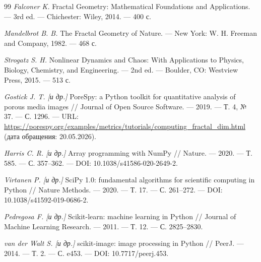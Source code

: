 \begin{thebibliography}{99}
\emph{Falconer K.} Fractal Geometry: Mathematical Foundations and
Applications. --- 3rd ed. --- Chichester: Wiley, 2014. --- 400 с.

\emph{Mandelbrot B. B.} The Fractal Geometry of Nature. --- New York:
W. H. Freeman and Company, 1982. --- 468 с.

\emph{Strogatz S. H.} Nonlinear Dynamics and Chaos: With Applications to
Physics, Biology, Chemistry, and Engineering. --- 2nd ed. --- Boulder, CO:
Westview Press, 2015. --- 513 с.

\emph{Gostick J. T. [и др.]} PoreSpy: a Python toolkit for quantitative
analysis of porous media images // Journal of Open Source Software. ---
2019. --- Т. 4, № 37. --- С. 1296. --- URL:
\url{https://porespy.org/examples/metrics/tutorials/computing_fractal_dim.html}
(дата обращения: 20.05.2026).

\emph{Harris C. R. [и др.]} Array programming with NumPy // Nature. ---
2020. --- Т. 585. --- С. 357--362. --- DOI: 10.1038/s41586-020-2649-2.

\emph{Virtanen P. [и др.]} SciPy 1.0: fundamental algorithms for scientific
computing in Python // Nature Methods. --- 2020. --- Т. 17. --- С. 261--272. ---
DOI: 10.1038/s41592-019-0686-2.

\emph{Pedregosa F. [и др.]} Scikit-learn: machine learning in Python //
Journal of Machine Learning Research. --- 2011. --- Т. 12. --- С. 2825--2830.

\emph{van der Walt S. [и др.]} scikit-image: image processing in Python //
PeerJ. --- 2014. --- Т. 2. --- С. e453. --- DOI: 10.7717/peerj.453.

\end{thebibliography}
